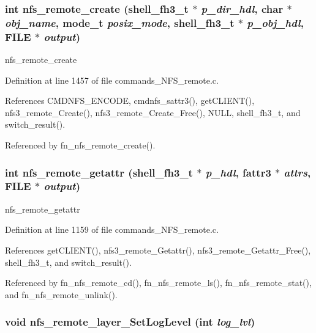 \subsubsection{\setlength{\rightskip}{0pt plus 5cm}int nfs\_\-remote\_\-create ({\bf shell\_\-fh3\_\-t} $\ast$ {\em p\_\-dir\_\-hdl}, char $\ast$ {\em obj\_\-name}, mode\_\-t {\em posix\_\-mode}, {\bf shell\_\-fh3\_\-t} $\ast$ {\em p\_\-obj\_\-hdl}, FILE $\ast$ {\em output})}\label{commands__NFS__remote_8c_a48}


nfs\_\-remote\_\-create 

Definition at line 1457 of file commands\_\-NFS\_\-remote.c.

References CMDNFS\_\-ENCODE, cmdnfs\_\-sattr3(), get\-CLIENT(), nfs3\_\-remote\_\-Create(), nfs3\_\-remote\_\-Create\_\-Free(), NULL, shell\_\-fh3\_\-t, and switch\_\-result().

Referenced by fn\_\-nfs\_\-remote\_\-create().
\subsubsection{\setlength{\rightskip}{0pt plus 5cm}int nfs\_\-remote\_\-getattr ({\bf shell\_\-fh3\_\-t} $\ast$ {\em p\_\-hdl}, fattr3 $\ast$ {\em attrs}, FILE $\ast$ {\em output})}\label{commands__NFS__remote_8c_a41}


nfs\_\-remote\_\-getattr 

Definition at line 1159 of file commands\_\-NFS\_\-remote.c.

References get\-CLIENT(), nfs3\_\-remote\_\-Getattr(), nfs3\_\-remote\_\-Getattr\_\-Free(), shell\_\-fh3\_\-t, and switch\_\-result().

Referenced by fn\_\-nfs\_\-remote\_\-cd(), fn\_\-nfs\_\-remote\_\-ls(), fn\_\-nfs\_\-remote\_\-stat(), and fn\_\-nfs\_\-remote\_\-unlink().
\subsubsection{\setlength{\rightskip}{0pt plus 5cm}void nfs\_\-remote\_\-layer\_\-Set\-Log\-Level (int {\em log\_\-lvl})}\label{commands__NFS__remote_8c_a35}




